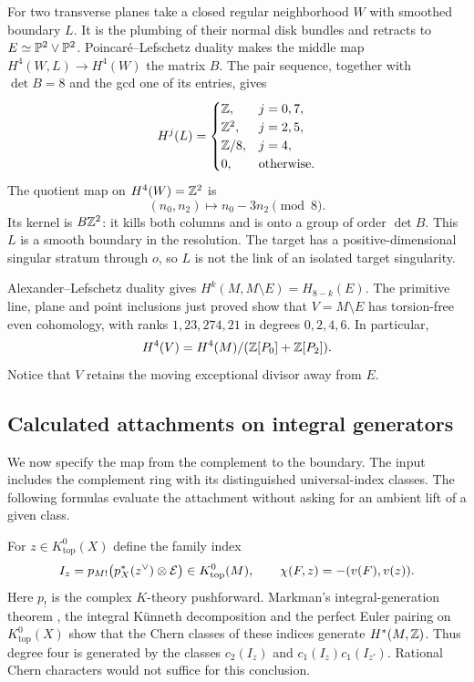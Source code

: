 For two transverse planes take a closed regular
neighborhood $W$ with smoothed boundary $L$. It
is the plumbing of their normal disk bundles and
retracts to $E\simeq\mathbb P^2\vee\mathbb P^2$.
Poincar\'e--Lefschetz duality makes the middle map
$H^4(W,L)\to H^4(W)$ the matrix $B$.
The pair sequence, together with $\det B=8$ and
the gcd one of its entries, gives
\begin{equation}\label{eq:two-plane-boundary}
 H^j(L)=
 \begin{cases}
 \mathbb Z,&j=0,7,\\
 \mathbb Z^2,&j=2,5,\\
 \mathbb Z/8,&j=4,\\
 0,&\text{otherwise}.
 \end{cases}
\end{equation}
The quotient map on $H^4(W)=\mathbb Z^2$ is
\begin{equation}\label{eq:boundary-functional}
 (n_0,n_2)\longmapsto n_0-3n_2\pmod8.
\end{equation}
Its kernel is $B\mathbb Z^2$: it kills both columns and
is onto a group of order $\det B$.
This $L$ is a smooth boundary in the resolution.
The target has a positive-dimensional singular
stratum through $o$, so $L$ is not the link of an
isolated target singularity.

Alexander--Lefschetz duality gives
$H^k(M,M\setminus E)=H_{8-k}(E)$. The primitive
line, plane and point inclusions just proved show
that $V=M\setminus E$ has torsion-free even
cohomology, with ranks $1,23,274,21$ in degrees
$0,2,4,6$. In particular,
\begin{equation}\label{eq:complement-quotient}
 H^4(V)=H^4(M)/(\mathbb Z[P_0]+\mathbb Z[P_2]).
\end{equation}
Notice that $V$ retains the moving exceptional
divisor away from $E$.

\subsection{Calculated attachments on integral generators}
We now specify the map from the complement to the
boundary. The input includes the complement ring
with its distinguished universal-index classes.
The following formulas evaluate the attachment
without asking for an ambient lift of a given class.

For $z\in K^0_{\mathrm{top}}(X)$ define the family
index
\begin{equation}\label{eq:universal-index}
 I_z=p_{M!}\bigl(p_X^*(z^\vee)\otimes\mathcal E\bigr)
       \in K^0_{\mathrm{top}}(M),\qquad
 \chi(F,z)=-(v(F),v(z)).
\end{equation}
Here $p_!$ is the complex $K$-theory pushforward.
Markman's integral-generation theorem
\cite[Theorem~1]{markman}, the integral K\"unneth
decomposition and the perfect Euler pairing on
$K^0_{\mathrm{top}}(X)$ show that the Chern classes
of these indices generate $H^*(M,\mathbb Z)$. Thus degree
four is generated by the classes $c_2(I_z)$ and
$c_1(I_z)c_1(I_{z'})$. Rational Chern characters
would not suffice for this conclusion.

